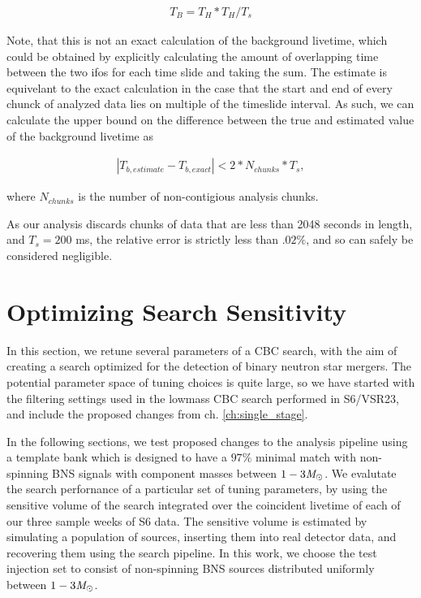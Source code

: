 \begin{eqnarray}
T_B =  T_H * T_H / T_s
\end{eqnarray}

Note, that this is not an exact calculation of the background livetime, which could be obtained by explicitly calculating the amount of overlapping time between the two ifos for each time slide and taking the sum. The estimate is equivelant to the exact calculation in the case that the start and end of every chunck of analyzed data lies on multiple of the timeslide interval. As such, we can calculate the upper bound on the difference between the true and estimated value of the background livetime as

\begin{eqnarray}
|T_{b, estimate} - T_{b, exact} |< 2 * N_{chunks} * T_s,
\end{eqnarray}

where $N_{chunks}$ is the number of non-contigious analysis chunks.

As our analysis discards chunks of data that are less than 2048 seconds in length, and  $T_s=200$ ms, the relative error is strictly less than $.02\%$, and so can safely be considered negligible.

\section{Optimizing Search Sensitivity}
\label{sec:tuning}

In this section, we retune several parameters of a CBC search, with the aim of creating a search optimized for the detection of binary neutron star mergers. The potential parameter space of tuning choices is quite large, so we have started with the filtering settings used in the lowmass CBC search performed in S6/VSR23, and include the proposed changes from ch. \ref{ch:single_stage}. 

In the following sections, we test proposed changes to the analysis pipeline using a template bank which is designed to have a $97\%$ minimal match with non-spinning BNS signals with component masses between $1-3 \mathit{M}_\odot$. We evalutate the search perfornance of a particular set of tuning parameters, by using the  sensitive volume of the search integrated over the coincident livetime of each of our three sample weeks of S6 data. The sensitive volume is estimated by simulating a population of sources, inserting them into real detector data, and recovering them using the search pipeline. In this work, we choose the test injection set to consist of non-spinning BNS sources distributed uniformly between $1-3 \mathit{M}_\odot$.

